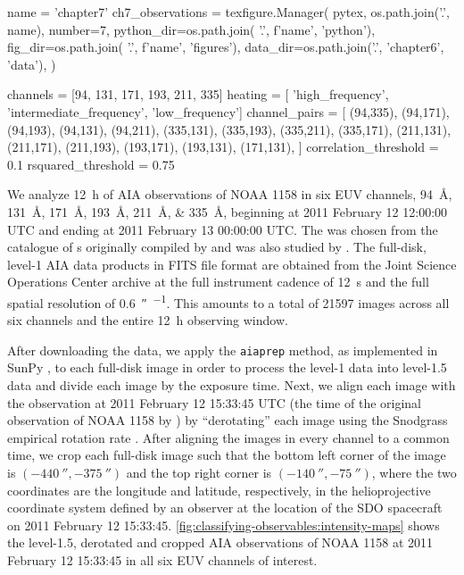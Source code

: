 \begin{pycode}
name = 'chapter7'
ch7_observations = texfigure.Manager(
    pytex,
    os.path.join('.', name),
    number=7,
    python_dir=os.path.join( '.', f'{name}', 'python'),
    fig_dir=os.path.join( '.', f'{name}', 'figures'),
    data_dir=os.path.join('.', 'chapter6', 'data'),
)

channels = [94, 131, 171, 193, 211, 335]
heating = [ 'high_frequency', 'intermediate_frequency', 'low_frequency']
channel_pairs = [
    (94,335),
    (94,171),
    (94,193),
    (94,131),
    (94,211),
    (335,131),
    (335,193),
    (335,211),
    (335,171),
    (211,131),
    (211,171),
    (211,193),
    (193,171),
    (193,131),
    (171,131),
]
correlation_threshold = 0.1
rsquared_threshold = 0.75
\end{pycode}

We analyze \SI{12}{\hour} of AIA observations of \AR{} NOAA 1158 in six EUV channels, \SIlist{94;131; 171;193;211;335}{\angstrom}, beginning at 2011 February 12 12:00:00 UTC and ending at 2011 February 13 00:00:00 UTC. The \AR{} was chosen from the catalogue of \AR s originally compiled by \citet{warren_systematic_2012} and was also studied by \citet{viall_survey_2017}. The full-disk, level-1 AIA data products in FITS file format are obtained from the Joint Science Operations Center \citep[JSOC,][]{couvidat_observables_2016} archive at the full instrument cadence of \SI{12}{\second} and the full spatial resolution of \SI{0.6}{\arcsecond\per\pixel}. This amounts to a total of 21597 images across all six channels and the entire \SI{12}{\hour} observing window.

After downloading the data, we apply the \texttt{aiaprep} method, as implemented in SunPy \citep{sunpy_community_sunpypython_2015}, to each full-disk image in order to process the level-1 data into level-1.5 data and divide each image by the exposure time. Next, we align each image with the observation at 2011 February 12 15:33:45 UTC (the time of the original observation of NOAA 1158 by \citet{warren_systematic_2012}) by ``derotating'' each image using the Snodgrass empirical rotation rate \citep{snodgrass_magnetic_1983}. After aligning the images in every channel to a common time, we crop each full-disk image such that the bottom left corner of the image is $(\SI{-440}{\arcsecond},\SI{-375}{\arcsecond})$ and the top right corner is $(\SI{-140}{\arcsecond},\SI{-75}{\arcsecond})$, where the two coordinates are the longitude and latitude, respectively, in the helioprojective coordinate system \citep[see][]{thompson_coordinate_2006} defined by an observer at the location of the SDO spacecraft on 2011 February 12 15:33:45. \autoref{fig:classifying-observables:intensity-maps} shows the level-1.5, derotated and cropped AIA observations of \AR{} NOAA 1158 at 2011 February 12 15:33:45 in all six EUV channels of interest.


